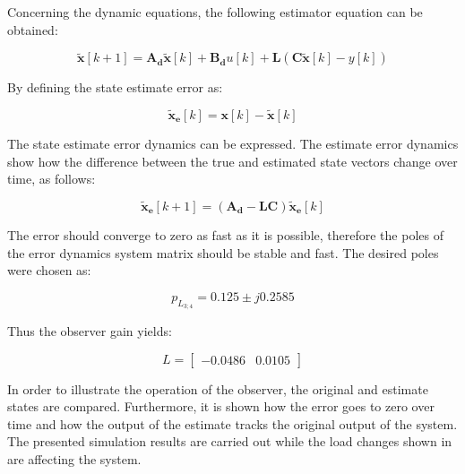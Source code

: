 Concerning the dynamic equations, the following estimator equation can be obtained: 

\begin{equation}
  \label{eq:estimator_eq}
    \mathbf{\tilde{x}}[k+1] = \mathbf{A_d} \mathbf{\tilde{x}}[k] + \mathbf{B_d} u[k] + \mathbf{L} (\mathbf{C}\mathbf{\tilde{x}}[k] - y[k])
  \end{equation}

By defining the state estimate error as: 

\begin{equation}
  \label{eq:estimator_error}
    \mathbf{\tilde{x}_e}[k] = \mathbf{x}[k] - \mathbf{\tilde{x}}[k]
  \end{equation}
  
  The state estimate error dynamics can be expressed. The estimate error dynamics show how the difference between the true and estimated state vectors change over time, as follows: 
  
\begin{equation}
  \label{eq:error_dynamics}
    \mathbf{\tilde{x}_e}[k+1] = (\mathbf{A_d} - \mathbf{L}\mathbf{C}) \mathbf{\tilde{x}_e}[k]
  \end{equation}
  
The error should converge to zero as fast as it is possible, therefore the poles of the error dynamics system matrix should be stable and fast. The desired poles were chosen as: 

\begin{equation}
  \label{eq:desired_poles_observer1}
  p_{L_{3;4}} = 0.125 \pm j0.2585
  \end{equation}
  
Thus the observer gain yields: 

  
    \begin{equation}
\label{eq:L_d}
    L
=
 \begin{bmatrix}
    -0.0486 & 0.0105
\end{bmatrix}
\end{equation}

In order to illustrate the operation of the observer, the original and estimate states are compared. Furthermore, it is shown how the error goes to zero over time and how the output of the estimate tracks the original output of the system. The presented simulation results are carried out while the load changes shown in  are affecting the system. 

